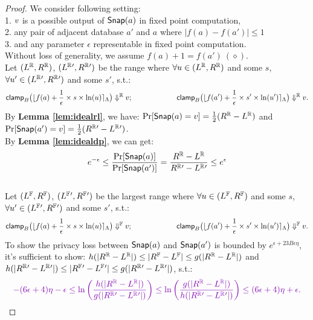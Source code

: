 \documentclass[a4paper,11pt]{article}
\begin{document}
\begin{proof}
%
%
We consider following setting:
\\
1. $v$ is a possible output of $\mathsf{Snap}(a)$ in fixed point computation,
%
\\
2. any pair of adjacent database $a'$ and $a$ where $|f(a) - f(a')| \leq 1$
%
\\
3. and any parameter $\epsilon$ representable in fixed point computation.
%
\\
Without loss of generality, we assume $f(a) + 1 = f(a') ~ (\diamond)$.
%
\\
%
%
Let $(L^{\mathbb{R}}, R^{\mathbb{R}})$, $(L^{\mathbb{R}}{'}, R^{\mathbb{R}}{'})$ be the range where 
$\forall u \in (L^{\mathbb{R}}, R^{\mathbb{R}})$ and some $s$, 
$\forall u' \in (L^{\mathbb{R}}{'}, R^{\mathbb{R}}{'})$ and some $s'$, s.t.:
%
$$\mathsf{clamp}_B \big(
	\lfloor f(a) + \frac{1}{\epsilon} \times s \times \ln (u) \rceil_{\Lambda}
	\big)
	 \Downarrow^{\mathbb{R}} v; 
~~~~~~~~~~~~~~~~~~
\mathsf{clamp}_B \big(
	\lfloor f(a') + \frac{1}{\epsilon} \times s' \times \ln (u') \rceil_{\Lambda}
	\big)
	 \Downarrow^{\mathbb{R}} v.$$
%
By \textbf{Lemma \ref{lem:idealrl}}, we have:
$\Pr[\mathsf{Snap}(a) = v] = \frac{1}{2} (R^{\mathbb{R}} - L^{\mathbb{R}})$ 
and $\Pr[\mathsf{Snap}(a') = v] = \frac{1}{2} (R^{\mathbb{R}}{'} - L^{\mathbb{R}}{'})$.
%
\\
%
By \textbf{Lemma \ref{lem:idealdp}}, we can get:
\[
	e^{-\epsilon} \leq \frac{\Pr[\mathsf{Snap}(a)]}{\Pr[\mathsf{Snap}(a')]}
	= \frac{R^{\mathbb{R}} - L^{\mathbb{R}}}{R^{\mathbb{R}}{'} - L^{\mathbb{R}}{'}} \leq e^{\epsilon}
\]
%
\\
%
Let $(L^{\mathbb{F}}, R^{\mathbb{F}})$, $(L^{\mathbb{F}}{'}, R^{\mathbb{F}}{'})$ be the largest range where 
$\forall u \in (L^{\mathbb{F}}, R^{\mathbb{F}})$ and some $s$, 
$\forall u' \in (L^{\mathbb{F}}{'}, R^{\mathbb{F}}{'})$ and some $s'$, s.t.:
%
$$
\mathsf{clamp}_B \big(
	\lfloor f(a) + \frac{1}{\epsilon} \times s \times \ln (u) \rceil_{\Lambda}
	\big)
	\Downarrow^{\mathbb{F}} v; 
~~~~~~~~~~~~~~~~~~
\mathsf{clamp}_B \big(
	\lfloor f(a') + \frac{1}{\epsilon} \times s' \times \ln (u') \rceil_{\Lambda}
	\big)
	\Downarrow^{\mathbb{F}} v.$$
%
To show the privacy loss between $\mathsf{Snap}(a)$ and $\mathsf{Snap}(a')$ is bounded by $e^{\epsilon + 23 B \epsilon \eta}$, it’s sufficient to show:
%
%
$h(|{R^{\mathbb{R}}} - {L^{\mathbb{R}}}|) \leq |R^{\mathbb{F}} - L^{\mathbb{F}}| \leq g(|{R^{\mathbb{R}}} - {L^{\mathbb{R}}}|)$ and 
$h(|{R^{\mathbb{R}}{'}} - {L^{\mathbb{R}}{'}}|) \leq |R^{\mathbb{F}}{'} - L^{\mathbb{F}}{'}|
\leq g(|{R^{\mathbb{R}}{'}} - {L^{\mathbb{R}}{'}}|) $,
%
s.t.:
%
\[
\extend{
	-(6 \epsilon + 4) \eta - \epsilon
	\leq \ln\left(
	 \frac{h(|{\rvalR} - {\rvalL}|)}{g(|{\rvalR{'}} - {\rvalL{'}}|)} 
	 \right) 
	\leq
	\ln\left( 
	\frac{g(|{\rvalR} - {\rvalL}|)}{h(|{\rvalR{'}} - {\rvalL{'}}|)} 
	\right)
	\leq (6 \epsilon + 4) \eta + \epsilon.
	}
\]

\end{proof}
\end{document}
